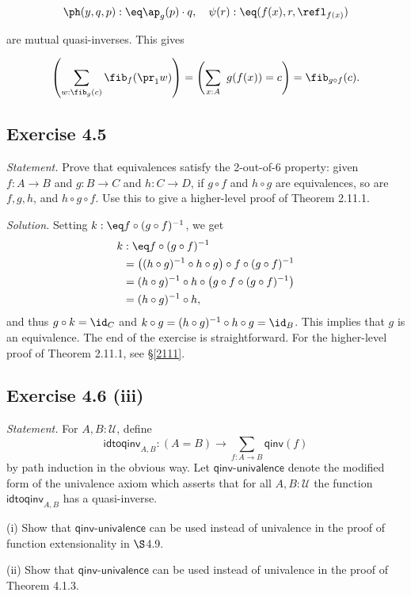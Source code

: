 \documentclass[12pt]{article}
\begin{document}
$$\ph(y,q,p):\eq\ap_g(p)\cdot q,\quad\psi(r):\eq(f(x),r,\refl_{f(x)})$$ 

\nn are mutual quasi-inverses. This gives 

$$\left(\sum_{w:\fib_g(c)}\fib_f(\pr_1w)\right)=\left(\sum_{x:A}\ g(f(x))=c\right)=\fib_{g\circ f}(c).$$


\subsection{Exercise 4.5}\label{45}

\emph{Statement.} Prove that equivalences satisfy the 2-out-of-6 property: given $f:A\to B$ and $g:B\to C$ and $h:C\to D$, if $g\circ f$ and $h\circ g$ are equivalences, so are $f,g,h$, and $h\circ g\circ f$. Use this to give a higher-level proof of Theorem 2.11.1.

\nn\emph{Solution.} Setting $k:\eq f\circ (g\circ f)^{-1}$, we get 
\begin{align*}
k&:\eq f\circ (g\circ f)^{-1}\\
&=\big((h\circ g)^{-1}\circ h\circ g\big)\circ f\circ (g\circ f)^{-1}\\
&=(h\circ g)^{-1}\circ h\circ\big(g\circ f\circ (g\circ f)^{-1}\big)\\
&=(h\circ g)^{-1}\circ h,
\end{align*}
and thus $g\circ k=\id_C$ and $k\circ g=(h\circ g)^{-1}\circ h\circ g=\id_B$. This implies that $g$ is an equivalence. The end of the exercise is straightforward. For the higher-level proof of Theorem 2.11.1, see \S\ref{2111}.


\subsection{Exercise 4.6 (iii)}

\emph{Statement.} For $A,B:\mathcal U$, define
$$
\mathsf{idtoqinv}_{A,B}:(A=B)\to\sum_{f:A\to B}\mathsf{qinv}(f)
$$
by path induction in the obvious way. Let $\mathsf{qinv}$-$\mathsf{univalence}$ denote the modified form of the univalence axiom which asserts that for all $A,B:\mathcal U$ the function $\mathsf{idtoqinv}_{A,B}$ has a quasi-inverse.

\nn(i) Show that $\mathsf{qinv}$-$\mathsf{univalence}$ can be used instead of univalence in the proof of function extensionality in $\S$4.9.

\nn(ii) Show that $\mathsf{qinv}$-$\mathsf{univalence}$ can be used instead of univalence in the proof of Theorem 4.1.3.
\end{document}
